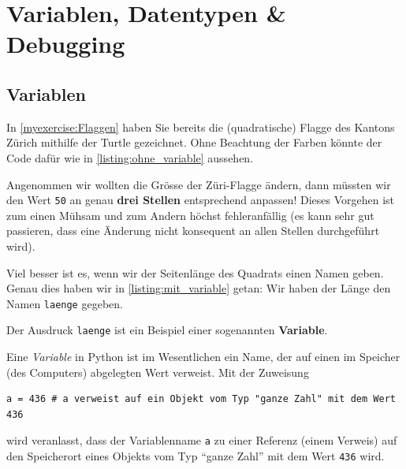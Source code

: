 \chapter{Variablen, Datentypen \& Debugging}\label{ch:K03_Variables_Debugging}

\section{Variablen}
\begin{myexample}\label{myexample:ersteVariable}
In \cref{myexercise:Flaggen} haben Sie bereits die (quadratische) Flagge des Kantons Zürich mithilfe der Turtle gezeichnet. Ohne Beachtung der Farben könnte der Code dafür wie in \cref{listing:ohne_variable} aussehen.



Angenommen wir wollten die Grösse der Züri-Flagge ändern, dann müssten wir den Wert \lstinline|50| an genau \textbf{drei Stellen} entsprechend anpassen! Dieses Vorgehen ist zum einen Mühsam und zum Andern höchst fehleranfällig (es kann sehr gut passieren, dass eine Änderung nicht konsequent an allen Stellen durchgeführt wird).

Viel besser ist es, wenn wir der Seitenlänge des Quadrats einen Namen geben. Genau dies haben wir in \cref{listing:mit_variable} getan: Wir haben der Länge den Namen \lstinline|laenge| gegeben.

Der Ausdruck \lstinline|laenge| ist ein Beispiel einer sogenannten \textbf{Variable}.
\end{myexample}

\begin{mydefinition}
Eine \emph{Variable} in Python ist im Wesentlichen ein Name, der auf einen im Speicher (des Computers) abgelegten Wert verweist. Mit der Zuweisung
\begin{lstlisting}[numbers=none]
	a = 436 # a verweist auf ein Objekt vom Typ "ganze Zahl" mit dem Wert 436
	\end{lstlisting}
wird veranlasst, dass der Variablenname \lstinline|a| zu einer Referenz (einem Verweis) auf den Speicherort eines Objekts vom Typ \enquote{ganze Zahl} mit dem Wert \lstinline|436| wird.
\end{mydefinition}

